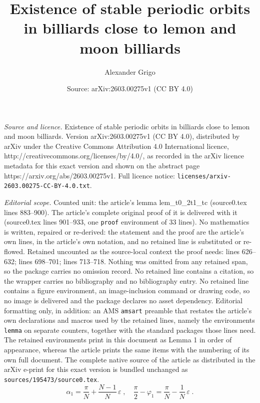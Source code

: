\documentclass[10pt,a4paper]{amsart}
\title{Existence of stable periodic orbits in billiards close to lemon and moon billiards}
\author{Alexander Grigo}
\date{Source: arXiv:2603.00275v1 (CC BY 4.0)}
\begin{document}
\maketitle

\noindent\emph{Source and licence.} Existence of stable periodic orbits in billiards close to lemon and moon billiards. Version arXiv:2603.00275v1 (CC BY 4.0), distributed by arXiv under the Creative Commons Attribution 4.0 International licence, http://creativecommons.org/licenses/by/4.0/, as recorded in the arXiv licence metadata for this exact version and shown on the abstract page https://arxiv.org/abs/2603.00275v1. Full licence notice: \texttt{licenses/arxiv-2603.00275-CC-BY-4.0.txt}.\par\smallskip

\noindent\textit{Editorial scope.} Counted unit: the article's lemma lem\_t0\_2t1\_tc (source0.tex lines 883--900). The article's complete original proof of it is delivered with it (source0.tex lines 901--933, one \texttt{proof} environment of 33 lines). No mathematics is written, repaired or re-derived: the statement and the proof are the article's own lines, in the article's own notation, and no retained line is substituted or re-flowed.  Retained uncounted as the source-local context the proof needs: lines 626--632; lines 698--701; lines 713--718.  Nothing was omitted from any retained span, so the package carries no omission record.  No retained line contains a citation, so the wrapper carries no bibliography and no bibliography entry.  No retained line contains a figure environment, an image-inclusion command or drawing code, so no image is delivered and the package declares no asset dependency.  Editorial formatting only, in addition: an AMS \texttt{amsart} preamble that restates the article's own declarations and macros used by the retained lines, namely the environments \texttt{lemma} on separate counters, together with the standard packages those lines need.  The retained environments print in this document as Lemma 1 in order of appearance, whereas the article prints the same items with the numbering of its own full document.  The complete native source of the article as distributed in the arXiv e-print for this exact version is bundled unchanged as \texttt{sources/195473/source0.tex}.
\begin{equation}
  \label{eqn_phi1_alpha1}
  \alpha_1 = \frac{\pi}{N} + \frac{N-1}{N}\,\varepsilon
  \;,\quad
  \frac{\pi}{2} - \varphi_1 = \frac{\pi}{ N } - \frac{1}{N}\,\varepsilon
  \;.
\end{equation}
\end{document}
